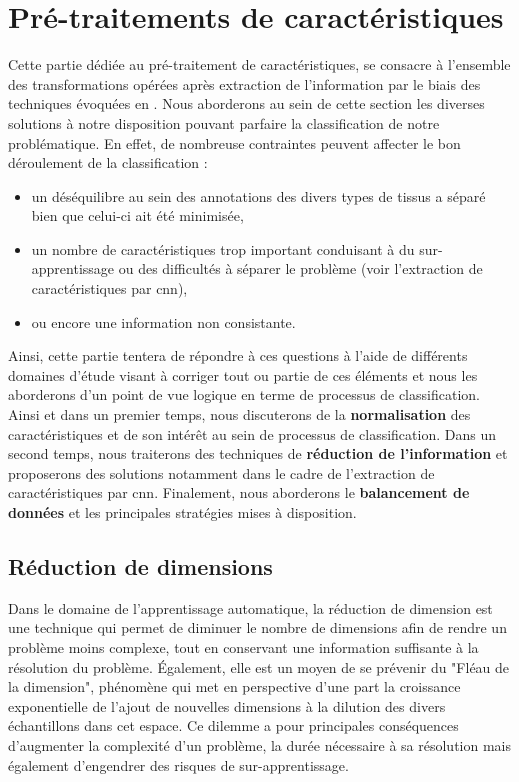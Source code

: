 \clearpage


\section{Pré-traitements de caractéristiques}
Cette partie dédiée au pré-traitement de caractéristiques, se consacre à l'ensemble des transformations opérées après extraction de l'information par le biais des techniques évoquées en . Nous aborderons au sein de cette section les diverses solutions à notre disposition pouvant parfaire la classification de notre problématique. En effet, de nombreuse contraintes peuvent affecter le bon déroulement de la classification :
\begin{itemize}
    \item un déséquilibre au sein des annotations des divers types de tissus a séparé bien que celui-ci ait été minimisée,
    \item un nombre de caractéristiques trop important conduisant à du sur-apprentissage ou des difficultés à séparer le problème (voir l'extraction de caractéristiques par \gls{cnn}),
    \item ou encore une information non consistante.
\end{itemize}\par

Ainsi, cette partie tentera de répondre à ces questions à l'aide de différents domaines d'étude visant à corriger tout ou partie de ces éléments et nous les aborderons d'un point de vue logique en terme de processus de classification. Ainsi et dans un premier temps, nous discuterons de la \textbf{normalisation} des caractéristiques et de son intérêt au sein de processus de classification. Dans un second temps, nous traiterons des techniques de \textbf{réduction de l'information} et proposerons des solutions notamment dans le cadre de l'extraction de caractéristiques par \gls{cnn}. Finalement, nous aborderons le \textbf{balancement de données} et les principales stratégies mises à disposition.

\subsection{Réduction de dimensions}
Dans le domaine de l'apprentissage automatique, la réduction de dimension est une technique qui permet de diminuer le nombre de dimensions afin de rendre un problème moins complexe, tout en conservant une information suffisante à la résolution du problème. Également, elle est un moyen de se prévenir du "Fléau de la dimension", phénomène qui met en perspective d'une part la croissance exponentielle de l'ajout de nouvelles dimensions à la dilution des divers échantillons dans cet espace. Ce dilemme a pour principales conséquences d'augmenter la complexité d'un problème, la durée nécessaire à sa résolution mais également d'engendrer des risques de sur-apprentissage.\par


